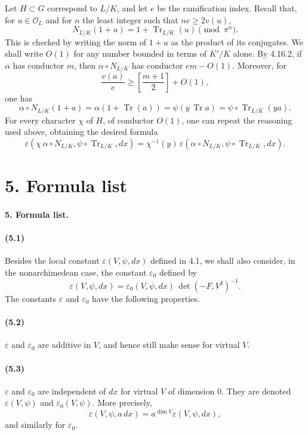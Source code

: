 \documentclass[10pt]{article}
\newcommand{\Tr}{\operatorname{Tr}}
\providecommand{\Tr}{\operatorname{Tr}}
\providecommand{\Tr}{\operatorname{Tr}}
\providecommand{\Tr}{\operatorname{Tr}}
\begin{document}
Let \(H\subset G\) correspond to \(L/K\), and let \(e\) be the ramification index. Recall that, for \(u\in\mathcal O_L\) and for \(n\) the least integer such that \(ne\ge2v(u)\),
\[
\tag{4.16.2}
N_{L/K}(1+u)=1+\Tr_{L/K}(u)\pmod{\pi^n}.
\]
This is checked by writing the norm of \(1+u\) as the product of its conjugates. We shall write \(O(1)\) for any number bounded in terms of \(K'/K\) alone. By 4.16.2, if \(\alpha\) has conductor \(m\), then \(\alpha\circ N_{L/K}\) has conductor \(em-O(1)\). Moreover, for
\[
\frac{v(a)}e\ge \left[\frac{m+1}{2}\right]+O(1),
\]
one has
\[
\alpha\circ N_{L/K}(1+a)
=
\alpha(1+\Tr(a))
=
\psi(y\,\Tr a)
=
\psi\circ\Tr_{L/K}(ya).
\]
For every character \(\chi\) of \(H\), of conductor \(O(1)\), one can repeat the reasoning used above, obtaining the desired formula
\[
\varepsilon(\chi\,\alpha\circ N_{L/K},\psi\circ\Tr_{L/K},dx)
=
\chi^{-1}(y)\,
\varepsilon(\alpha\circ N_{L/K},\psi\circ\Tr_{L/K},dx).
\]

\section*{5. Formula list}

\paragraph{5. Formula list.}

\paragraph{(5.1)} Besides the local constant \(\varepsilon(V,\psi,dx)\) defined in 4.1, we shall also consider, in the nonarchimedean case, the constant \(\varepsilon_0\) defined by
\[
\varepsilon(V,\psi,dx)
=
\varepsilon_0(V,\psi,dx)\,\det(-F,V^I)^{-1}.
\]
The constants \(\varepsilon\) and \(\varepsilon_0\) have the following properties.

\paragraph{(5.2)} \(\varepsilon\) and \(\varepsilon_0\) are additive in \(V\), and hence still make sense for virtual \(V\).

\paragraph{(5.3)} \(\varepsilon\) and \(\varepsilon_0\) are independent of \(dx\) for virtual \(V\) of dimension \(0\). They are denoted \(\varepsilon(V,\psi)\) and \(\varepsilon_0(V,\psi)\). More precisely,
\[
\varepsilon(V,\psi,a\,dx)=a^{\dim V}\varepsilon(V,\psi,dx),
\]
and similarly for \(\varepsilon_0\).
\end{document}
